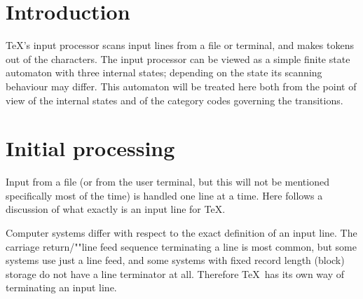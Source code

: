 \documentclass{book}
\begin{document}
\section{Introduction}

\TeX's input processor scans input lines from a file or terminal, and
makes tokens out of the characters.
The input processor can be viewed as
a simple finite state automaton with three internal states; 
depending on the state its scanning behaviour may differ.
This automaton will be treated here both from the point of view of the
internal states and of the category codes governing the
transitions.

\section{Initial processing}

Input from a file (or from the user terminal, but this
will not be mentioned specifically
most of the time) is handled one line at a time.
Here follows a discussion of what exactly is an input line
for \TeX.

Computer systems differ with respect to 
the exact definition of an input
\mdqon
line. The carriage return/""line feed
\mdqoff
{}%
sequence terminating a line is most common,
but some systems use just a line feed, and
some systems with fixed record length (block) storage do not have
a line terminator at all. Therefore \TeX\ has its
own way of terminating an input line.
\end{document}
